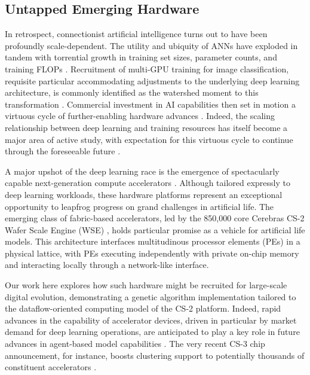 \subsection{Untapped Emerging Hardware}

In retrospect, connectionist artificial intelligence turns out to have been profoundly scale-dependent.
The utility and ubiquity of ANNs have exploded in tandem with torrential growth in training set sizes, parameter counts, and training FLOPs \citep{marcus2018deep}.
Recruitment of multi-GPU training for image classification, requisite particular accommodating adjustments to the underlying deep learning architecture, is commonly identified as the watershed moment to this transformation
 \citep{krizhevsky2012imagenet}.
Commercial investment in AI capabilities then set in motion a virtuous cycle of further-enabling hardware advances \citep{jouppi2017datacenter}.
Indeed, the scaling relationship between deep learning and training resources has itself become a major area of active study, with expectation for this virtuous cycle to continue through the foreseeable future \citep{kaplan2020scaling}.

A major upshot of the deep learning race is the emergence of spectacularly capable next-generation compute accelerators \citep{zhang2016cambricon,emani2021accelerating,jia2019dissecting,medina2020habana}.
Although tailored expressly to deep learning workloads, these hardware platforms represent an exceptional opportunity to leapfrog progress on grand challenges in artificial life.
The emerging class of fabric-based accelerators, led by the 850,000 core Cerebras CS-2 Wafer Scale Engine (WSE) \citep{lauterbach2021path,lie2022cerebras}, holds particular promise as a vehicle for artificial life models.
This architecture interfaces multitudinous processor elements (PEs) in a physical lattice, with PEs executing independently with private on-chip memory and interacting locally through a network-like interface.

Our work here explores how such hardware might be recruited for large-scale digital evolution, demonstrating a genetic algorithm implementation tailored to the dataflow-oriented computing model of the CS-2 platform.
Indeed, rapid advances in the capability of accelerator devices, driven in particular by market demand for deep learning operations, are anticipated to play a key role in future advances in agent-based model capabilities \citep{perumalla2022computer}.
The very recent CS-3 chip announcement, for instance, boosts clustering support to potentially thousands of constituent accelerators \citep{moore2024cerebras}.


